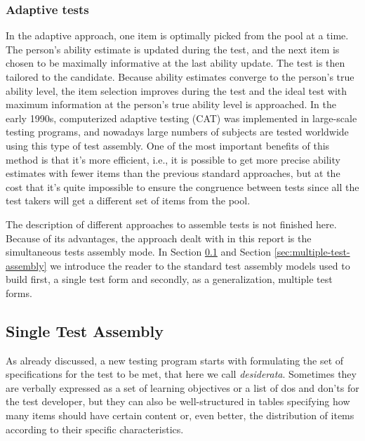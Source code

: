 \subsubsection{Adaptive tests}

In the adaptive approach, one item is optimally picked from the pool at a time.
The person's ability estimate is updated during the test, and the next item is chosen to be maximally informative at the last ability update.
The test is then tailored to the candidate.
Because ability estimates converge to the person's true ability level, the item selection improves during the test and the ideal test with maximum information at the person's true ability level is approached.
In the early 1990s, computerized adaptive testing (CAT) was implemented in large-scale testing programs, and nowadays large numbers of subjects are tested worldwide using this type of test assembly.
One of the most important benefits of this method is that it's more efficient, i.e., it is possible to get more precise ability estimates with fewer items than the previous standard approaches, but at the cost that it's quite impossible to ensure the congruence between tests since all the test takers will get a different set of items from the pool.

The description of different approaches to assemble tests is not finished here.
Because of its advantages, the approach dealt with in this report is the simultaneous tests assembly mode.
In Section \ref{sec:single-test-assembly} and Section \ref{sec:multiple-test-assembly} we introduce the reader to the standard test assembly models used to build first, a single test form and secondly, as a generalization, multiple test forms.

\subsection{Single Test Assembly}\label{sec:single-test-assembly}

As already discussed, a new testing program starts with formulating the set of specifications for the test to be met, that here we call \emph{desiderata}.
Sometimes they are verbally expressed as a set of learning objectives or a list of dos and don'ts for the test developer, but they can also be well-structured in tables specifying how many items should have certain content or, even better, the distribution of items according to their specific characteristics.

